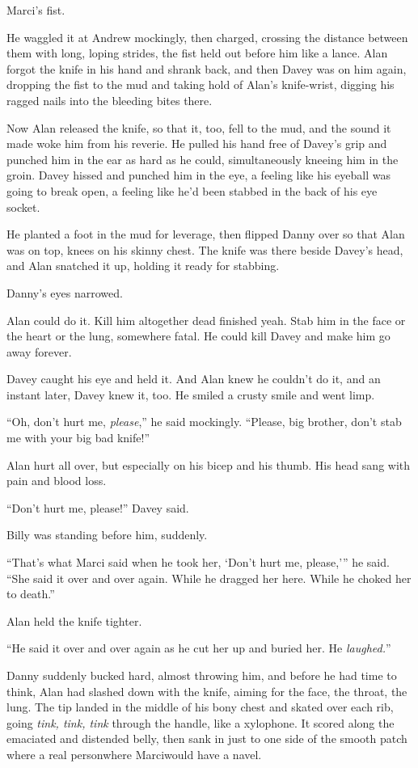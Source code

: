 Marci's fist.

He waggled it at Andrew mockingly, then charged, crossing the distance
between them with long, loping strides, the fist held out before him
like a lance.  Alan forgot the knife in his hand and shrank back, and
then Davey was on him again, dropping the fist to the mud and taking
hold of Alan's knife-wrist, digging his ragged nails into the bleeding
bites there.

Now Alan released the knife, so that it, too, fell to the mud, and the
sound it made woke him from his reverie.  He pulled his hand free of
Davey's grip and punched him in the ear as hard as he could,
simultaneously kneeing him in the groin.  Davey hissed and punched him
in the eye, a feeling like his eyeball was going to break open, a
feeling like he'd been stabbed in the back of his eye socket.

He planted a foot in the mud for leverage, then flipped Danny over so
that Alan was on top, knees on his skinny chest.  The knife was there
beside Davey's head, and Alan snatched it up, holding it ready for
stabbing.

Danny's eyes narrowed.

Alan could do it.  Kill him altogether dead finished yeah.  Stab him
in the face or the heart or the lung, somewhere fatal.  He could kill
Davey and make him go away forever.

Davey caught his eye and held it.  And Alan knew he couldn't do it,
and an instant later, Davey knew it, too.  He smiled a crusty smile
and went limp.

``Oh, don't hurt me, \textit{please},'' he said mockingly.  ``Please,
big brother, don't stab me with your big bad knife!''

Alan hurt all over, but especially on his bicep and his thumb.  His
head sang with pain and blood loss.

``Don't hurt me, please!'' Davey said.

Billy was standing before him, suddenly.

``That's what Marci said when he took her, `Don't hurt me, please,'''
he said.  ``She said it over and over again.  While he dragged her
here.  While he choked her to death.''

Alan held the knife tighter.

``He said it over and over again as he cut her up and buried her.  He
\textit{laughed.}''

Danny suddenly bucked hard, almost throwing him, and before he had
time to think, Alan had slashed down with the knife, aiming for the
face, the throat, the lung.  The tip landed in the middle of his bony
chest and skated over each rib, going \textit{tink, tink, tink}
through the handle, like a xylophone.  It scored along the emaciated
and distended belly, then sank in just to one side of the smooth patch
where a real person\dash{}where Marci\dash{}would have a navel.

